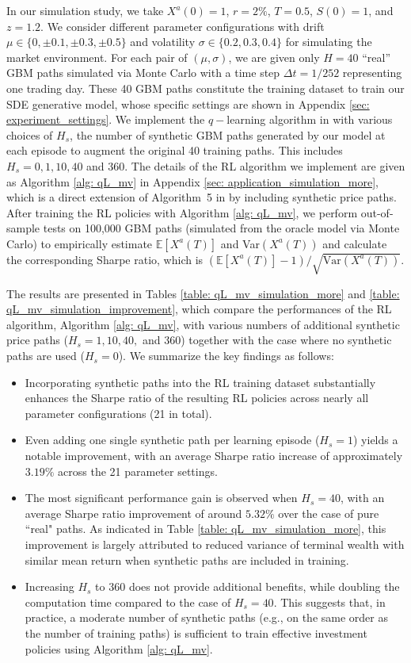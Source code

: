 \documentclass[11pt]{article}
\newcommand{\mE}{\mathbb{E}}
\begin{document}
In our simulation study, we take $X^a(0)=1$, $r=2\%$, $T=0.5$, $S(0)=1$, and $z=1.2$. 
We consider different parameter configurations with drift $\mu\in\{0, \pm 0.1, \pm 0.3, \pm 0.5\}$ and volatility $\sigma\in\{0.2, 0.3, 0.4\}$ for simulating the market environment. For each pair of $(\mu, \sigma)$, we are given only $H=40$ ``real'' GBM paths simulated via Monte Carlo with a time step $\Delta t =1/252$ representing one trading day.
These 40 GBM paths constitute the training dataset to train our SDE generative model, whose specific settings are shown in Appendix \ref{sec: experiment_settings}. We implement the $q-$learning algorithm in \cite{jia2023q} with various choices of $H_s$, the number of synthetic GBM paths generated by our model at each episode to augment the original 40 training paths. This includes $H_s = 0, 1, 10, 40$ and $360$. The details of the RL algorithm we implement are given as Algorithm \ref{alg: qL_mv} in Appendix \ref{sec: application_simulation_more}, which is a direct extension of Algorithm~5 in \cite{jia2023q} by including synthetic price paths.
After training the RL policies with Algorithm \ref{alg: qL_mv}, we perform out-of-sample tests on 100,000 GBM paths (simulated from the oracle model via Monte Carlo) to empirically estimate $\mathbb{E}[X^a(T)]$ and Var$(X^a(T))$ and calculate the corresponding Sharpe ratio, which is $(\mE[X^a(T)] - 1)/\sqrt{\text{Var}(X^a(T))}$. 


The results are presented in Tables \ref{table: qL_mv_simulation_more} and \ref{table: qL_mv_simulation_improvement}, which compare the performances of the RL algorithm, Algorithm \ref{alg: qL_mv}, with various numbers of additional synthetic price paths ($H_s = 1, 10, 40,$ and $360$) together with the case where no synthetic paths are used ($H_s=0$). We summarize the key findings as follows:
\begin{itemize}
\item Incorporating synthetic paths into the RL training dataset substantially enhances the Sharpe ratio of the resulting RL policies across nearly all parameter configurations (21 in total).
\item Even adding one single synthetic path per learning episode ($H_s=1$) yields a notable improvement, with an average Sharpe ratio increase of approximately $3.19\%$ across the 21 parameter settings.
\item The most significant performance gain is observed when $H_s=40$, with an average Sharpe ratio improvement of around $5.32\%$ over the case of pure ``real" paths. As indicated in Table \ref{table: qL_mv_simulation_more}, this improvement is largely attributed to reduced variance of terminal wealth with similar mean return when synthetic paths are included in training.
\item Increasing $H_s$ to 360 does not provide additional benefits, while doubling the computation time compared to the case of $H_s=40$. This suggests that, in practice, a moderate number of synthetic paths (e.g., on the same order as the number of training paths) is sufficient to train effective investment policies using Algorithm \ref{alg: qL_mv}. 
\end{itemize}
\end{document}

